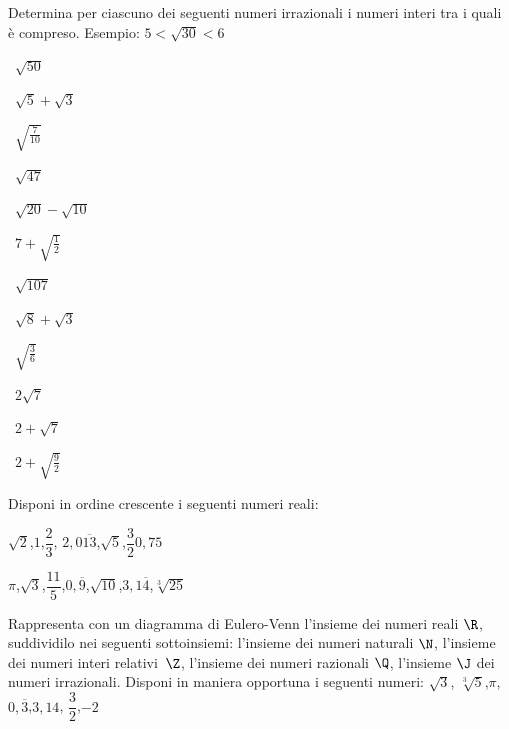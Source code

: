 \begin{esercizio}
\label{ese:1.4}
Determina per ciascuno dei seguenti numeri irrazionali i numeri interi tra 
i quali è compreso. Esempio: \(5<\sqrt{30}<6\)
\begin{htmulticols}{4}
\begin{enumeratea}
\item~\(\sqrt{50}\)
\item~\(\sqrt 5+\sqrt 3\)
\item~\(\sqrt{\frac 7{10}}\)
\item~\(\sqrt{47}\)
\item~\(\sqrt{20}-\sqrt{10}\)
\item~\(7+\sqrt{\frac{1}{2}}\)
\item~\(\sqrt{107}\)
\item~\(\sqrt{8}+\sqrt{3}\)
\item~\(\sqrt{\frac{3}{6}}\)
\item~\(2\sqrt 7\)
\item~\(2+\sqrt 7\)
\item~\(2+\sqrt{\frac{9}{2}}\)
\end{enumeratea}
\end{htmulticols}
\end{esercizio}

\begin{esercizio}
\label{ese:1.5}
Disponi in ordine crescente i seguenti numeri reali:
\begin{enumeratea}
\item \(\sqrt 2\),\quad \(1\),\quad \(\dfrac 2 3\),\quad 
\(2,0\overline{13}\),\quad \(\sqrt 5\),\quad \(\dfrac 3 2\)\quad \(0,75\)
\item \(\pi\),\quad \(\sqrt 3\),\quad \(\dfrac{11} 5\),\quad \(0,\overline 
9\),\quad \(\sqrt{10}\),\quad \(3,1\overline 4\),\quad \(\sqrt[3]{25}\)
\end{enumeratea}
\end{esercizio}

\begin{esercizio}
\label{ese:1.6}
Rappresenta con un diagramma di Eulero-Venn l'insieme dei numeri reali 
\(\R\), suddividilo nei seguenti sottoinsiemi: l'insieme dei numeri 
naturali \(\N\), l'insieme dei numeri interi relativi~\(\Z\), l'insieme 
dei numeri razionali \(\Q\), l'insieme \(\J\) dei numeri irrazionali. 
Disponi in maniera opportuna i seguenti numeri: \(\sqrt 3\),\quad 
\(\sqrt[3]5\),\quad\(\pi\),\quad \(0,\overline 3\),\quad \(3,14\),\quad 
\(\dfrac 3 2\),\quad\(-2\)
\end{esercizio}

